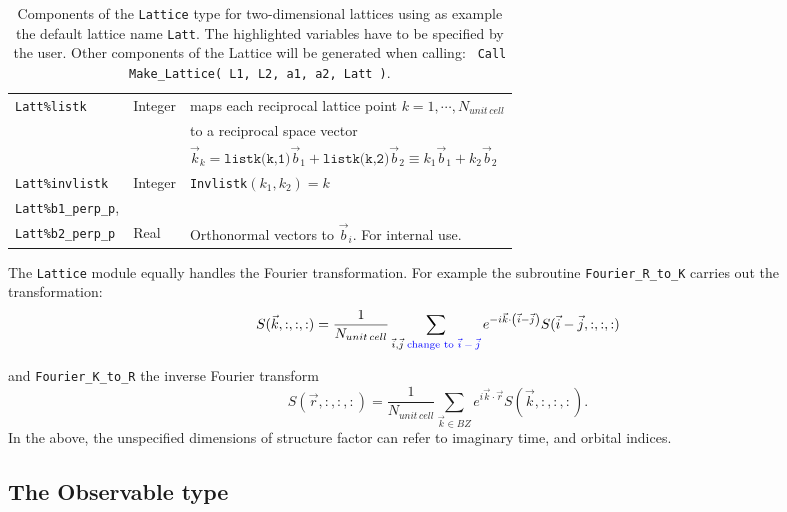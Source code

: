 \begin{table}[h]
\begin{tabular}{l l l}
    \texttt{Latt\%listk}                                           &  Integer &  maps each reciprocal lattice point $k=1,\cdots, N_{unit\,cell}$\\
                                                                          &    & to a reciprocal space vector\\
                                                                          &     & $\vec{k}_k= \texttt{listk(k,1)} \vec{b}_1 +  \texttt{listk(k,2)} \vec{b}_2  \equiv k_1  \vec{b}_1 +   k_2  \vec{b}_2 $\\
    \texttt{Latt\%invlistk}                                     &    Integer    &   \texttt{Invlistk}$(k_1,k_2) = k $ \\
   \texttt{Latt\%b1\_perp\_p},  \\ 
   \texttt{Latt\%b2\_perp\_p}                             &    Real         &  Orthonormal vectors to $\vec{b}_i$.  For internal use. 
   \end{tabular}
   \caption{Components of the \texttt{Lattice} type for two-dimensional lattices using as example the default lattice name \texttt{Latt}.
   The highlighted variables have to be specified by the user.  Other components of the Lattice will be generated  when calling: \texttt{ Call Make\_Lattice( L1, L2, a1,  a2, Latt )}.  
    \label{table:lattice}}
\end{table}
%
The \texttt{Lattice}  module equally handles  the Fourier transformation.  For example  the  subroutine  \texttt{Fourier\_R\_to\_K}   carries out the  transformation: 
\begin{equation}
	S(\vec{k}, :,:,:) =  \frac{1}{N_{unit \,cell}}  \sum_{\vec{i},\vec{j} \;\text{{\color{blue} change to $\vec{i}-\vec{j}$}}}   e^{-i \vec{k} \cdot \left( \vec{i}-\vec{j} \right)} S(\vec{i}  - \vec{j}, :,:,:)
\end{equation}

and  \texttt{Fourier\_K\_to\_R}  the  inverse Fourier transform 
 \begin{equation}
	S(\vec{r}, :,:,:) =  \frac{1}{N_{unit \,cell}}  \sum_{\vec{k} \in BZ }   e^{ i \vec{k} \cdot \vec{r}} S(\vec{k}, :,:,:).
\end{equation}
In the above,   the unspecified dimensions of   structure factor can refer  to imaginary time,  and orbital indices. 


\subsection{The Observable type}\label{sec:obs}

